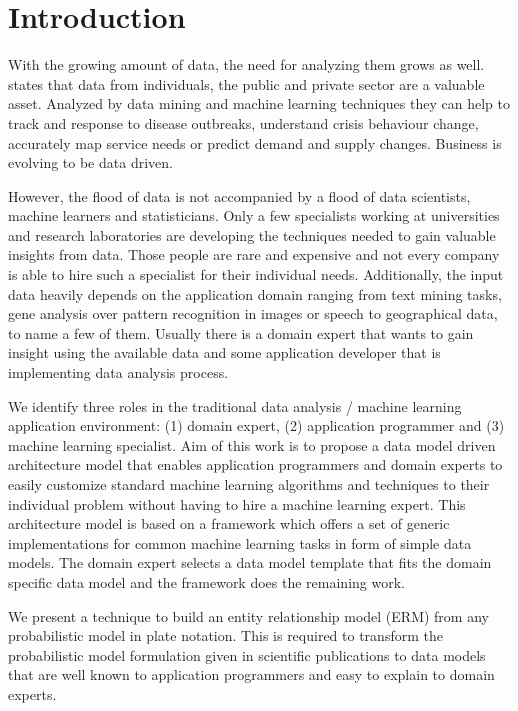 \section{Introduction}

With the growing amount of data, the need for analyzing them grows as well. \textcite{forum2012bigdata} states that data from individuals, the public and private sector are a valuable asset. Analyzed by data mining and machine learning techniques they can help to track and response to disease outbreaks, understand crisis behaviour change, accurately map service needs or predict demand and supply changes. Business is evolving to be data driven.

However, the flood of data is not accompanied by a flood of data scientists, machine learners and statisticians. Only a few specialists working at universities and research laboratories are developing the techniques needed to gain valuable insights from data. Those people are rare and expensive and not every company is able to hire such a specialist for their individual needs. Additionally, the input data heavily depends on the application domain ranging from text mining tasks, gene analysis over pattern recognition in images or speech to geographical data, to name a few of them. Usually there is a domain expert that wants to gain insight using the available data and some application developer that is implementing data analysis process.

We identify three roles in the traditional data analysis / machine learning application environment: (1) domain expert, (2) application programmer and (3) machine learning specialist. Aim of this work is to propose a data model driven architecture model that enables application programmers and domain experts to easily customize standard machine learning algorithms and techniques to their individual problem without having to hire a machine learning expert. This architecture model is based on a framework which offers a set of generic implementations for common machine learning tasks in form of simple data models. The domain expert selects a data model template that fits the domain specific data model and the framework does the remaining work. 

We present a technique to build an entity relationship model (ERM) from any probabilistic model in plate notation. This is required to transform the probabilistic model formulation given in scientific publications to data models that are well known to application programmers and easy to explain to domain experts.


